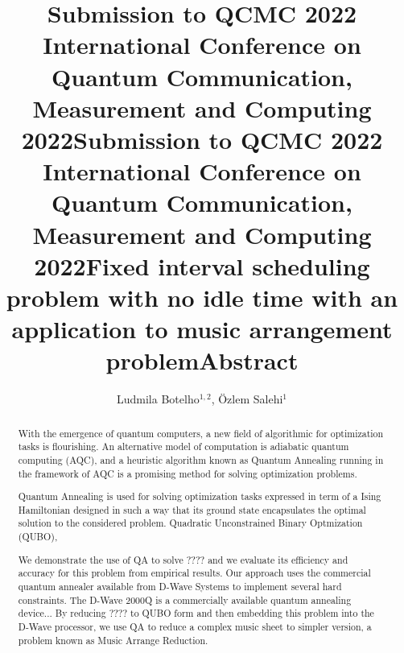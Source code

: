 \documentclass[aps,reprint]{revtex4-2}
\title@column %
\title{\normalsize Submission to QCMC 2022 \\ %
            International Conference on Quantum Communication,\\ 
            Measurement and Computing 2022}
\makeatletter
\newcommand{\printentry}{%
    \@author@finish%
    \title@column %
    \titleblock@produce %
    \suppressfloats[t] %
    \let\@AAC@list\@empty %
    \let\@AFF@list\@empty %
    \let\@AFG@list\@empty %
    \let\@address\@empty %
    \titlepage@sw %
    {\vfil\clearpage}%
}
\newcommand{\printheader}{%
    \title{\normalsize Submission to QCMC 2022 \\ %
            International Conference on Quantum Communication,\\ 
            Measurement and Computing 2022}
    \printentry
}
\makeatother
\begin{document}
\printheader



\title{Fixed interval scheduling problem with no idle time with an application to music arrangement problem} %
\author{Ludmila Botelho$^{1,2}$, \"Ozlem Salehi$^{1}$} %
{} %

\printentry
\title{\small Abstract}
\begin{abstract}
  
  With the emergence of quantum computers, a new field of algorithmic for optimization tasks is flourishing. An alternative model of computation is adiabatic quantum computing (AQC), and a heuristic algorithm known as Quantum Annealing running in the framework of AQC is a promising method for solving optimization problems. 
  
  Quantum Annealing is used for solving optimization tasks expressed in term of a Ising Hamiltonian designed in such a way that its ground state encapsulates the optimal solution to the considered problem. Quadratic Unconstrained Binary Optmization (QUBO),
  
  We demonstrate the use of QA to solve ???? and we evaluate its efficiency and accuracy for this problem
  from empirical results. Our approach uses the commercial quantum annealer available from D-Wave Systems to
  implement several hard constraints. The D-Wave 2000Q is a commercially available quantum annealing device... By reducing ???? to QUBO form and then embedding this problem into the D-Wave processor, we use QA to reduce a complex music sheet to simpler version, a problem known as Music Arrange Reduction. \end{abstract}
\printentry
\end{document}
